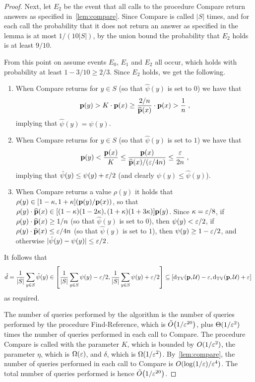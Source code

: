 \begin{proof}
 Next, let $E_2$ be the event that all calls to the procedure
 {\sc Compare} return answers as specified in~\cref{lem:compare}.
 Since {\sc Compare} is called $|S|$ times, and for each call the probability
 that it does not return an answer as specified in the lemma is
 at most $1/(10|S|)$, by the union bound
 the probability that $E_2$ holds is at least
 $9/10$.

From this point on assume events $E_0$, $E_1$ and $E_2$ all occur, which
holds with probability at least $1- 3/10\geq 2/3$.
Since $E_2$ holds, we get the following.
\begin{enumerate}
\item When {\sc Compare} returns \high for $y\in S$
(so that $\hat{\psi}(y)$ is set to $0$) we have that
\begin{equation}
\mathbf{p}(y) > K \cdot \mathbf{p}(x) \geq \frac{2/n}{\widehat{\mathbf{p}}(x)}\cdot\mathbf{p}(x) > \frac{1}{n}\;,
\end{equation}
implying that $\hat{\psi}(y) =\psi(y)$.
\item When {\sc Compare} returns \low for $y\in S$
(so that $\hat{\psi}(y)$ is set to $1$) we have that
\begin{equation}
\mathbf{p}(y) <  \frac{\mathbf{p}(x)}{K} \leq  \frac{\mathbf{p}(x)}{\widehat{\mathbf{p}}(x)/(\varepsilon/4n)}
            \leq \frac{\varepsilon}{2n}\;,
\end{equation}
implying that $\hat{\psi}(y) \leq \psi(y) + \varepsilon/2$
(and clearly $\psi(y) \leq \hat{\psi}(y)$).
\item When {\sc Compare} returns a value $\rho(y)$
it holds that $\rho(y) \in [1-\kappa,1+\kappa](\mathbf{p}(y)/\mathbf{p}(x))$,
so that $\rho(y)\cdot \widehat{\mathbf{p}}(x) \in [(1-\kappa)(1-2\kappa),(1+\kappa)(1+3\kappa)]\mathbf{p}(y)$. Since $\kappa = \varepsilon/8$, if $\rho(y)\cdot\widehat{\mathbf{p}}(x)\geq 1/n$
(so that $\hat{\psi}(y)$ is set
to $0$), then $\psi(y) < \varepsilon/2$,
if $\rho(y)\cdot\widehat{\mathbf{p}}(x) \leq \varepsilon/4n$
(so that $\hat{\psi}(y)$ is set to $1$), then
$\psi(y) \geq 1- \varepsilon/2$, and otherwise
$|\hat{\psi}(y) - \psi(y)|\leq \varepsilon/2$.
\end{enumerate}
It follows that
\begin{equation}
\hat{d} = \frac{1}{|S|}\sum_{y\in S}\hat{\psi}(y)
   \in \left[\frac{1}{|S|}\sum_{y\in S} \psi(y) -\varepsilon/2,
 \frac{1}{|S|}\sum_{y\in S} \psi(y) +\varepsilon/2\right]
 \subseteq [\operatorname{d}_{\textrm{TV}}(\mathbf{p},\mathcal{U})-\varepsilon,\operatorname{d}_{\textrm{TV}}(\mathbf{p},\mathcal{U})+\varepsilon]\;
\end{equation}
as required.

The number of queries performed by the algorithm is
the number of queries performed by the procedure
{\sc Find-Reference}, which is {$\tildeO{1/\eps^{20}}$}, plus
$\Theta(1/\varepsilon^2)$ times the number of queries performed in each
call to {\sc Compare}. The procedure  {\sc Compare} is
called with the parameter $K$, which is
bounded by $O(1/\varepsilon^2)$, the parameter $\eta$, which is
$\Omega(\varepsilon)$, and $\delta$, which is $\Omega(1/\varepsilon^2)$.
By~\cref{lem:compare}, the number of queries performed
in each call to {\sc Compare} is
$O(\log(1/\varepsilon)/\varepsilon^4)$.
The total number of queries performed is hence {$\tildeO{ 1/\eps^{20} }$}.
\end{proof}


